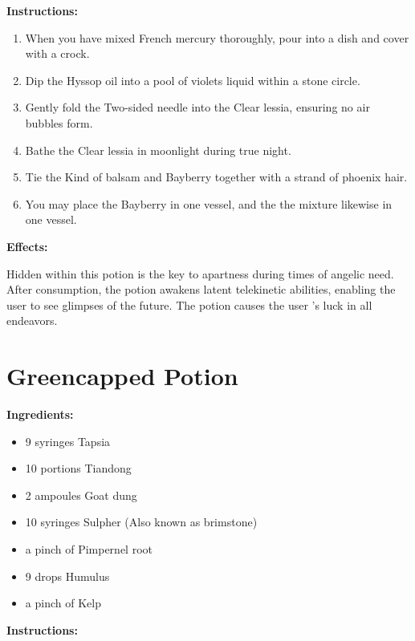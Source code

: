 \documentclass{article}
\begin{document}
\textbf{Instructions:}

\begin{enumerate}
  \item When you have mixed French mercury thoroughly, pour into a dish and cover with a crock.
  \item Dip the Hyssop oil into a pool of violets liquid within a stone circle.
  \item Gently fold the Two-sided needle into the Clear lessia, ensuring no air bubbles form.
  \item Bathe the Clear lessia in moonlight during true night.
  \item Tie the Kind of balsam and Bayberry together with a strand of phoenix hair.
  \item You may place the Bayberry in one vessel, and the the mixture likewise in one vessel.
\end{enumerate}

\textbf{Effects:}

Hidden within this potion is the key to apartness during times of angelic need. After consumption, the potion awakens latent telekinetic abilities, enabling the user to see glimpses of the future. The potion causes the user 's luck in all endeavors.

\newpage
\section*{Greencapped Potion}

\textbf{Ingredients:}

\begin{itemize}
  \item 9 syringes Tapsia
  \item 10 portions Tiandong
  \item 2 ampoules Goat dung
  \item 10 syringes Sulpher (Also known as brimstone)
  \item a pinch of Pimpernel root
  \item 9 drops Humulus
  \item a pinch of Kelp
\end{itemize}

\textbf{Instructions:}
\end{document}
